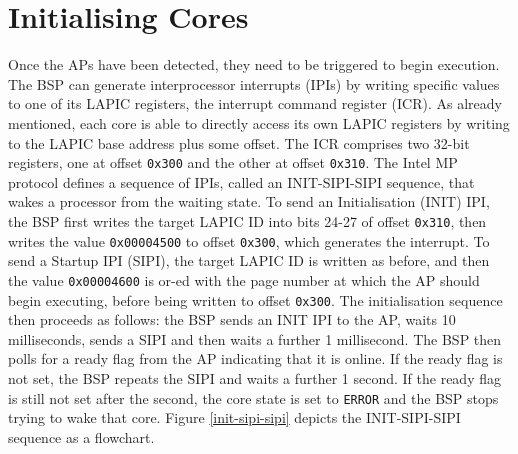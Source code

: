 \documentclass[bsc,frontabs,singlespacing,parskip,deptreport]{infthesis}
\begin{document}
\section{Initialising Cores} \label{initialising-cores}
Once the APs have been detected, they need to be triggered to begin execution. The BSP can generate interprocessor interrupts (IPIs) by writing specific values to one of its LAPIC registers, the interrupt command register (ICR). As already mentioned, each core is able to directly access its own LAPIC registers by writing to the LAPIC base address plus some offset. The ICR comprises two 32-bit registers, one at offset \verb|0x300| and the other at offset \verb|0x310|. The Intel MP protocol defines a sequence of IPIs, called an INIT-SIPI-SIPI sequence, that wakes a processor from the waiting state. To send an Initialisation (INIT) IPI, the BSP first writes the target LAPIC ID into bits 24-27 of offset \verb|0x310|, then writes the value \verb|0x00004500| to offset \verb|0x300|, which generates the interrupt. To send a Startup IPI (SIPI), the target LAPIC ID is written as before, and then the value \verb|0x00004600| is or-ed with the page number at which the AP should begin executing, before being written to offset \verb|0x300|. The initialisation sequence then proceeds as follows: the BSP sends an INIT IPI to the AP, waits 10 milliseconds, sends a SIPI and then waits a further 1 millisecond. The BSP then polls for a ready flag from the AP indicating that it is online. If the ready flag is not set, the BSP repeats the SIPI and waits a further 1 second. If the ready flag is still not set after the second, the core state is set to \verb|ERROR| and the BSP stops trying to wake that core. Figure \ref{init-sipi-sipi} depicts the INIT-SIPI-SIPI sequence as a flowchart.
\end{document}
